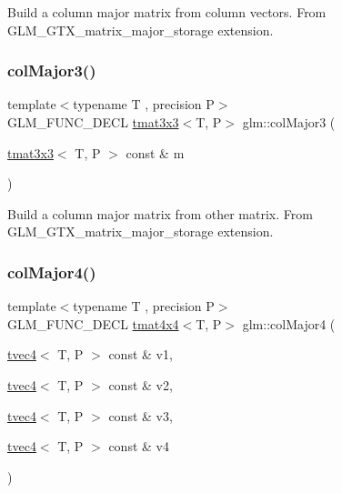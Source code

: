 Build a column major matrix from column vectors. From G\+L\+M\+\_\+\+G\+T\+X\+\_\+matrix\+\_\+major\+\_\+storage extension. \mbox{\label{group__gtx__matrix__major__storage_gaa93f3dcc47ced18e5db4a853363d9386}} 
\subsubsection{\texorpdfstring{col\+Major3()}{colMajor3()}\hspace{0.1cm}{\footnotesize\ttfamily [2/2]}}
{\footnotesize\ttfamily template$<$typename T , precision P$>$ \\
G\+L\+M\+\_\+\+F\+U\+N\+C\+\_\+\+D\+E\+CL \hyperlink{structglm_1_1tmat3x3}{tmat3x3}$<$T, P$>$ glm\+::col\+Major3 (\begin{DoxyParamCaption}\item[{\hyperlink{structglm_1_1tmat3x3}{tmat3x3}$<$ T, P $>$ const \&}]{m }\end{DoxyParamCaption})}

Build a column major matrix from other matrix. From G\+L\+M\+\_\+\+G\+T\+X\+\_\+matrix\+\_\+major\+\_\+storage extension. \mbox{\label{group__gtx__matrix__major__storage_ga2829de096bb67ab5cd670958f3d402b6}} 
\subsubsection{\texorpdfstring{col\+Major4()}{colMajor4()}\hspace{0.1cm}{\footnotesize\ttfamily [1/2]}}
{\footnotesize\ttfamily template$<$typename T , precision P$>$ \\
G\+L\+M\+\_\+\+F\+U\+N\+C\+\_\+\+D\+E\+CL \hyperlink{structglm_1_1tmat4x4}{tmat4x4}$<$T, P$>$ glm\+::col\+Major4 (\begin{DoxyParamCaption}\item[{\hyperlink{structglm_1_1tvec4}{tvec4}$<$ T, P $>$ const \&}]{v1,  }\item[{\hyperlink{structglm_1_1tvec4}{tvec4}$<$ T, P $>$ const \&}]{v2,  }\item[{\hyperlink{structglm_1_1tvec4}{tvec4}$<$ T, P $>$ const \&}]{v3,  }\item[{\hyperlink{structglm_1_1tvec4}{tvec4}$<$ T, P $>$ const \&}]{v4 }\end{DoxyParamCaption})}

